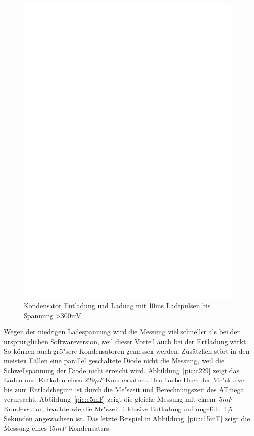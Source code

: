 \begin{figure}[H]
\centering
\includegraphics[]{../FIG/Bigcap.eps}
\caption{Kondensator Entladung und Ladung mit 10ms Ladepulsen bis Spannung \textgreater 300mV}
\label{fig:bigcap}
\end{figure}
Wegen der niedrigen Ladespannung wird die Messung viel schneller als bei der urspr\"unglichen Softwareversion,
weil dieser Vorteil auch bei der Entladung wirkt. So k\"onnen auch gr\"o"sere Kondensatoren gemessen werden.
Zus\"atzlich st\"ort in den meisten F\"allen eine parallel geschaltete Diode nicht die Messung, weil die Schwellspannung
der Diode nicht erreicht wird.
Abbildung~\ref{pic:c229} zeigt das Laden und Entladen eines \(229\mu F\) Kondensators.
Das flache Dach der Me"skurve bis zum Entladebeginn ist durch die Me"szeit und Berechnungszeit des ATmega verursacht.
Abbildung~\ref{pic:c5mF} zeigt die gleiche Messung mit einem~\(5mF\) Kondensator,
beachte wie die Me"szeit inklusive Entladung auf ungef\"ahr 1,5 Sekunden angewachsen ist.
Das letzte Beispiel in Abbildung~\ref{pic:c15mF} zeigt die Messung eines \(15mF\) Kondensators.

